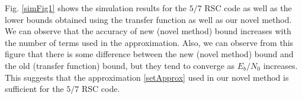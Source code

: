 \begin{example}
Fig. \ref{simFig1} shows the simulation results for the $5/7$ RSC code as well as the lower bounds obtained using the transfer function as well as our novel method. We can observe that the accuracy of new (novel method) bound increases with the number of terms used in the approximation. Also, we can observe from this figure that there is some difference between the new (novel method) bound and the old (transfer function) bound, but they tend to converge as $E_b/N_0$ increases. This suggests that the approximation \eqref{setApprox} used in our novel method is sufficient for the $5/7$ RSC code.
\label{5/7graph}
\end{example}




